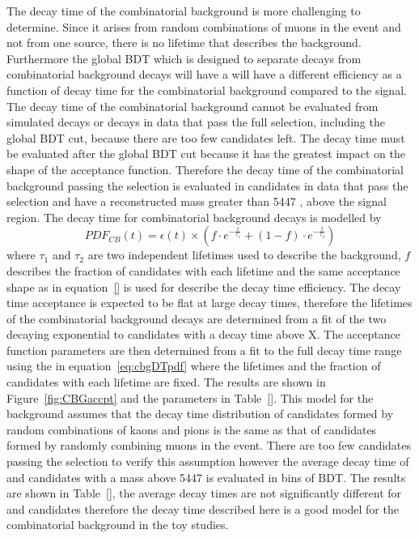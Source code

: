 {%

The decay time \pdf of the combinatorial background is more challenging to determine. Since it arises from random combinations of muons in the event and not from one source, there is no lifetime that describes the background. Furthermore the global BDT which is designed to separate \bsmumu decays from combinatorial background decays will have a will have a different efficiency as a function of decay time for the combinatorial background compared to the \bsmum signal. The decay time \pdf of the combinatorial background cannot be evaluated from simulated decays or decays in data that pass the full \bsmumu selection, including the global BDT cut, because there are too few candidates left. The decay time \pdf must be evaluated after the global BDT cut because it has the greatest impact on the shape of the acceptance function. Therefore the decay time \pdf of the combinatorial background passing the \bsmumu selection is evaluated in candidates in data that pass the \bhh selection and have a reconstructed mass greater than 5447 \mevcc, above the \bs signal region. The decay time \pdf for combinatorial background decays is modelled by
\begin{equation}
PDF_{CB}(t) = \epsilon(t)\times \left( f \cdot e^{-\frac{t}{\tau_{1}}} + (1-f)\cdot e^{-\frac{t}{\tau_{2}}} \right)
\label{eq:cbgDTpdf}
\end{equation}
where $\tau_{1}$ and $\tau_{2}$ are two independent lifetimes used to describe the background, $f$ describes the fraction of candidates with each lifetime and the same acceptance shape as in equation~\ref{} is used for describe the decay time efficiency. The decay time acceptance is expected to be flat at large decay times, therefore the lifetimes of the combinatorial background decays are determined from a \ml fit of the two decaying exponential to candidates with a decay time above X. The acceptance function parameters are then determined from a \ml fit to the full decay time range using the \pdf in equation~\ref{eq:cbgDTpdf} where the lifetimes and the fraction of candidates with each lifetime are fixed. The results are shown in Figure~\ref{fig:CBGaccpt} and the \pdf parameters in Table~\ref{}. This model for the background assumes that the decay time distribution of \bhh candidates formed by random combinations of kaons and pions is the same as that of \bsmumu candidates formed by randomly combining muons in the event. There are too few candidates passing the \bsmumu selection to verify this assumption however the average decay time of \bhh and \bsmumu candidates with a mass above 5447 \mevcc is evaluated in bins of BDT. The results are shown in Table~\ref{}, the average decay times are not significantly different for \bhh and \bsmumu candidates therefore the decay time \pdf described here is a good model for the combinatorial background in the toy studies.


}
